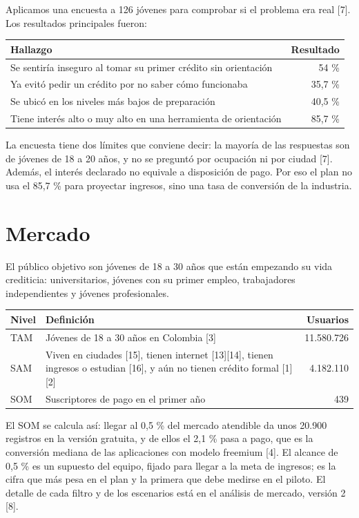 \documentclass[11pt,a4paper]{article}
\begin{document}
Aplicamos una encuesta a 126 jóvenes para comprobar si el problema era real [7]. Los resultados principales fueron:

\begin{tabularx}{\textwidth}{X r}
  \toprule
  \textbf{Hallazgo} & \textbf{Resultado} \\
  \midrule
  Se sentiría inseguro al tomar su primer crédito sin orientación & 54 \% \\
  Ya evitó pedir un crédito por no saber cómo funcionaba & 35,7 \% \\
  Se ubicó en los niveles más bajos de preparación & 40,5 \% \\
  Tiene interés alto o muy alto en una herramienta de orientación & 85,7 \% \\
  \bottomrule
\end{tabularx}

La encuesta tiene dos límites que conviene decir: la mayoría de las respuestas son de jóvenes de 18 a 20 años, y no se preguntó por ocupación ni por ciudad [7]. Además, el interés declarado no equivale a disposición de pago. Por eso el plan no usa el 85,7 \% para proyectar ingresos, sino una tasa de conversión de la industria.

\section{Mercado}

El público objetivo son jóvenes de 18 a 30 años que están empezando su vida crediticia: universitarios, jóvenes con su primer empleo, trabajadores independientes y jóvenes profesionales.

\begin{tabularx}{\textwidth}{l X r}
  \toprule
  \textbf{Nivel} & \textbf{Definición} & \textbf{Usuarios} \\
  \midrule
  TAM & Jóvenes de 18 a 30 años en Colombia [3] & 11.580.726 \\
  SAM & Viven en ciudades [15], tienen internet [13][14], tienen ingresos o estudian [16], y aún no tienen crédito formal [1][2] & 4.182.110 \\
  SOM & Suscriptores de pago en el primer año & 439 \\
  \bottomrule
\end{tabularx}

El SOM se calcula así: llegar al 0,5 \% del mercado atendible da unos 20.900 registros en la versión gratuita, y de ellos el 2,1 \% pasa a pago, que es la conversión mediana de las aplicaciones con modelo freemium [4]. El alcance de 0,5 \% es un supuesto del equipo, fijado para llegar a la meta de ingresos; es la cifra que más pesa en el plan y la primera que debe medirse en el piloto. El detalle de cada filtro y de los escenarios está en el análisis de mercado, versión 2 [8].
\end{document}
